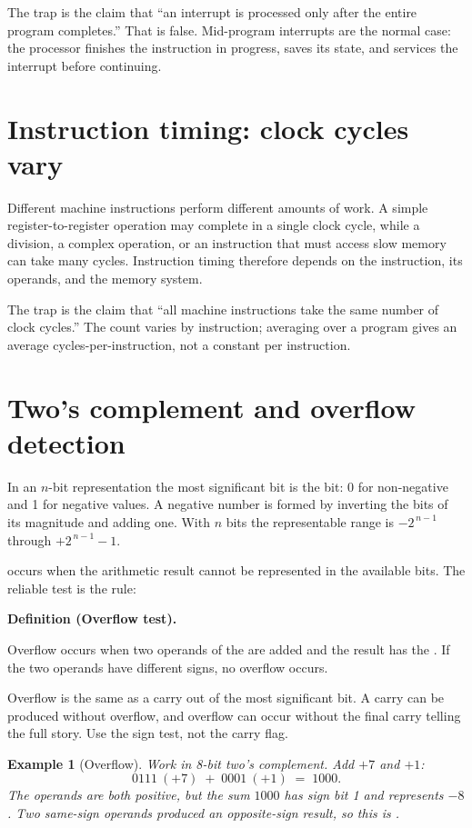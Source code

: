 \documentclass[11pt]{article}
\newtheorem{example}{Example}[section]
\newenvironment{definitionbox}[1]{%
  \par\noindent\textbf{Definition (#1).}\ \itshape
}{\par\vspace{0.3em}}
\begin{document}
The trap is the claim that ``an interrupt is processed only after the entire
program completes.'' That is false. Mid-program interrupts are the normal
case: the processor finishes the instruction in progress, saves its state, and
services the interrupt before continuing.

\section{Instruction timing: clock cycles vary}
Different machine instructions perform different amounts of work. A simple
register-to-register operation may complete in a single clock cycle, while a
division, a complex operation, or an instruction that must access slow memory
can take many cycles. Instruction timing therefore depends on the
instruction, its operands, and the memory system.

The trap is the claim that ``all machine instructions take the same number of
clock cycles.'' The count varies by instruction; averaging over a program
gives an average cycles-per-instruction, not a constant per instruction.

\section{Two's complement and overflow detection}
In an $n$-bit  representation the most significant bit
is the  bit: 0 for non-negative and 1 for negative values. A
negative number is formed by inverting the bits of its magnitude and adding
one. With $n$ bits the representable range is
$-2^{\,n-1}$ through $+2^{\,n-1}-1$.

 occurs when the arithmetic result cannot be represented in the
available bits. The reliable test is the  rule:

\begin{definitionbox}{Overflow test}
Overflow occurs when two operands of the  are added and the
result has the . If the two operands have different signs,
no overflow occurs.
\end{definitionbox}

Overflow is  the same as a carry out of the most significant bit. A
carry can be produced without overflow, and overflow can occur without the
final carry telling the full story. Use the sign test, not the carry flag.

\begin{example}[Overflow]
Work in 8-bit two's complement. Add $+7$ and $+1$:
\[
0111\ (+\!7) \;+\; 0001\ (+\!1) \;=\; 1000.
\]
The operands are both positive, but the sum $1000$ has sign bit 1 and
represents $-8$. Two same-sign operands produced an opposite-sign result, so
this is .
\end{example}
\end{document}
